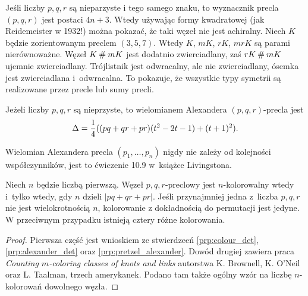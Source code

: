 Jeśli liczby $p, q, r$ są nieparzyste i tego samego znaku, to wyznacznik precla $(p, q, r)$ jest postaci $4n+3$.
Wtedy używając formy kwadratowej (jak Reidemeister w 1932!) można pokazać, że taki węzeł nie jest achiralny.
Niech $K$ będzie zorientowanym preclem $(3, 5, 7)$.
Wtedy $K$, $mK$, $rK$, $mrK$ są parami nierównoważne.
Węzeł $K \mathbin{\#} mK$ jest dodatnio zwierciadlany, zaś $rK \mathbin{\#} mK$ ujemnie zwierciadlany.
Trójlistnik jest odwracalny, ale nie zwierciadlany, ósemka jest zwierciadlana i~odwracalna.
To pokazuje, że wszystkie typy symetrii są realizowane przez precle lub sumy precli.

\begin{proposition}
    \label{prp:pretzel_alexander}
    Jeżeli liczby $p, q, r$ są nieprzyste, to wielomianem Alexandera $(p, q, r)$-precla jest
    \begin{equation}
        \Delta = \frac 14 ((pq+qr+pr) (t^2-2t-1) + (t+1)^2).
    \end{equation}
\end{proposition}

Wielomian Alexandera precla $(p_1, \ldots, p_n)$ nigdy nie zależy od kolejności współczynników, jest to ćwiczenie 10.9 w~książce Livingstona.

\begin{proposition}
    Niech $n$ będzie liczbą pierwszą.
    Węzeł $p, q, r$-preclowy jest $n$-kolorowalny wtedy i~tylko wtedy, gdy $n$ dzieli $|pq+qr+pr|$.
    Jeśli przynajmniej jedna z~liczba $p, q, r$ nie jest wielokrotnością $n$, kolorowanie z dokładnością do permutacji jest jedyne.
    W przeciwnym przypadku istnieją cztery różne kolorowania.
\end{proposition}

\begin{proof}
    Pierwsza część jest wnioskiem ze stwierdzeeń \ref{prp:colour_det}, \ref{prp:alexander_det} oraz \ref{prp:pretzel_alexander}.
    Dowód drugiej zawiera praca \emph{Counting $m$-coloring classes of knots and links} autorstwa K. Brownell, K. O'Neil oraz L. Taalman, trzech amerykanek.
    Podano tam także ogólny wzór na liczbę $n$-kolorowań dowolnego węzła.
\end{proof}

